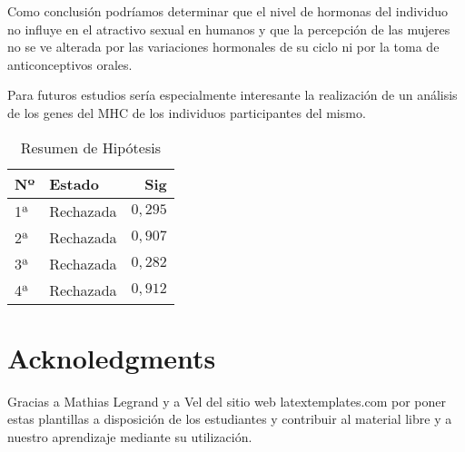 \documentclass[fleqn,10pt]{SelfArx} %
\begin{document}
Como conclusión podríamos determinar que el nivel de hormonas del individuo no influye en el atractivo sexual en humanos y que la percepción de las mujeres no se ve alterada por las variaciones hormonales de su ciclo ni por la toma de anticonceptivos orales.

Para futuros estudios sería especialmente interesante la realización de un análisis de los genes del MHC de los individuos participantes del mismo.

\begin{table}[hbt]
	\caption{Resumen de Hipótesis}
	\centering
	\begin{tabular}{llr}
		\toprule
		Nº & Estado & Sig \\
		\midrule
		1ª & Rechazada & $0,295$ \\
		2ª & Rechazada & $0,907$ \\
		3ª & Rechazada & $0,282$ \\
		4ª & Rechazada & $0,912$ \\
		\bottomrule
	\end{tabular}
	\label{tab:label}
\end{table}

 

\cite{*}

\section*{Acknoledgments}


Gracias a Mathias Legrand y a Vel del sitio web latextemplates.com por poner estas plantillas a disposición de los estudiantes y contribuir al material libre y a nuestro aprendizaje mediante su utilización.
\end{document}
